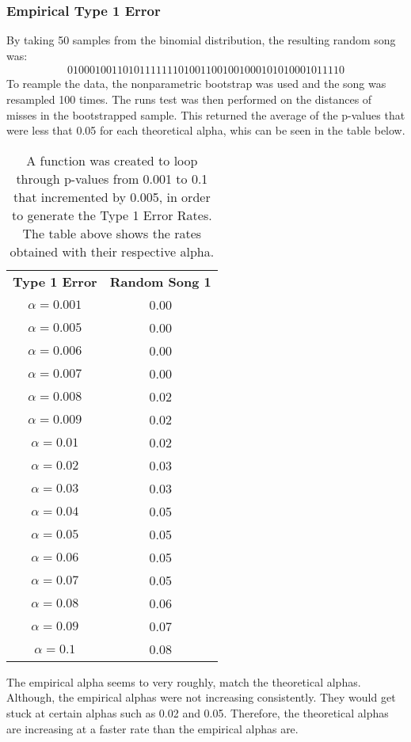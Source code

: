 \documentclass[12pt, letterpaper]{article}
\begin{document}
\subsubsection{Empirical Type 1 Error} 
By taking 50 samples from the binomial distribution, the resulting random song was:
\begin{gather*}
  0 1 0 0 0 1 0 0 1 1 0 1 0 1 1 1 1 1 1 1 0 
  1 0 0 1 1 0 0 1 0 0 1 0 0 0 1 0 1 0 1 0 0
  0 1 0 1 1 1 1 0
\end{gather*} 
To reample the data, the nonparametric bootstrap was used and the song was resampled 100 times. The runs test was then performed on the distances of misses in the bootstrapped sample. This returned the average of the p-values that were less that 0.05 for each theoretical alpha, whis can be seen in the table below.
\begin{table}[h]
\begin{center}
\begin{tabular}{|c|c|}
\textbf{Type 1 Error} & \textbf{Random Song 1}\\
$\alpha = 0.001$ & 0.00\\
$\alpha = 0.005$ &  0.00\\
$\alpha = 0.006$ &  0.00\\
$\alpha = 0.007$ & 0.00\\
$\alpha = 0.008$ & 0.02\\
$\alpha = 0.009$ & 0.02\\
$\alpha = 0.01$ & 0.02\\
$\alpha = 0.02$ & 0.03\\
$\alpha = 0.03$ & 0.03\\
$\alpha = 0.04$ & 0.05\\
$\alpha = 0.05$ &  0.05\\
$\alpha = 0.06$ &  0.05\\
$\alpha = 0.07$ &  0.05\\
$\alpha = 0.08$ &  0.06\\
$\alpha = 0.09$ & 0.07\\
$\alpha = 0.1$ & 0.08 \\ 
\end{tabular}
\end{center}
\caption{A function was created to loop through p-values from 0.001 to 0.1 that incremented by 0.005, in order to  generate the Type 1 Error Rates. The table above shows the rates obtained with their respective alpha.}
\label{fig: Type 1 Error Rates for Nonparametric Bootstrap}
\end{table}
The empirical alpha seems to very roughly, match the theoretical alphas. Although, the empirical alphas were not increasing consistently. They would get stuck at certain alphas such as 0.02 and 0.05. Therefore, the theoretical alphas are increasing at a faster rate than the empirical alphas are.
\end{document}
